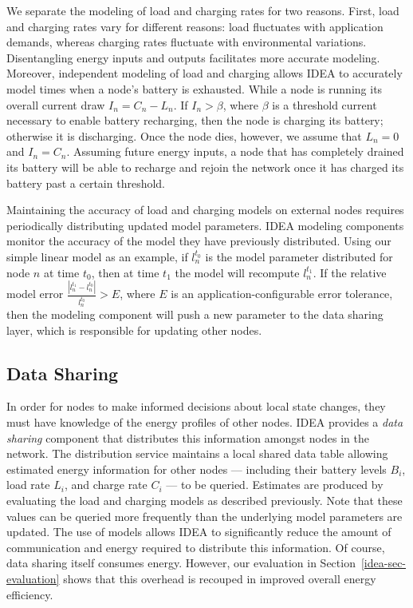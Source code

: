 We separate the modeling of load and charging rates for two reasons. First,
load and charging rates vary for different reasons: load fluctuates with
application demands, whereas charging rates fluctuate with environmental
variations. Disentangling energy inputs and outputs facilitates more accurate
modeling. Moreover, independent modeling of load and charging allows IDEA to
accurately model times when a node's battery is exhausted. While a node is
running its overall current draw $I_n = C_n - L_n$. If $I_n > \beta$, where
$\beta$ is a threshold current necessary to enable battery recharging, then
the node is charging its battery; otherwise it is discharging. Once the node
dies, however, we assume that $L_n = 0$ and $I_n = C_n$. Assuming future
energy inputs, a node that has completely drained its battery will be able to
recharge and rejoin the network once it has charged its battery past a
certain threshold.

Maintaining the accuracy of load and charging models on external nodes
requires periodically distributing updated model parameters. IDEA modeling
components monitor the accuracy of the model they have previously
distributed. Using our simple linear model as an example, if $l_n^{t_0}$ is
the model parameter distributed for node $n$ at time $t_0$, then at time
$t_1$ the model will recompute $l_n^{t_1}$. If the relative model error
$\frac{\left| l_n^{t_1} - l_n^{t_0} \right|}{l_n^{t_0}} > E$, where $E$ is an
application-configurable error tolerance, then the modeling component will
push a new parameter to the data sharing layer, which is responsible for
updating other nodes. 

\subsection{Data Sharing}

In order for nodes to make informed decisions about local state changes, they
must have knowledge of the energy profiles of other nodes. IDEA provides a
\textit{data sharing} component that distributes this information amongst
nodes in the network. The distribution service maintains a local shared data
table allowing estimated energy information for other nodes --- including
their battery levels $B_i$, load rate $L_i$, and charge rate $C_i$ --- to be
queried. Estimates are produced by evaluating the load and charging models as
described previously. Note that these values can be queried more frequently
than the underlying model parameters are updated. The use of models allows
IDEA to significantly reduce the amount of communication and energy required
to distribute this information. Of course, data sharing itself consumes
energy. However, our evaluation in Section~\ref{idea-sec-evaluation} shows
that this overhead is recouped in improved overall energy efficiency. 

